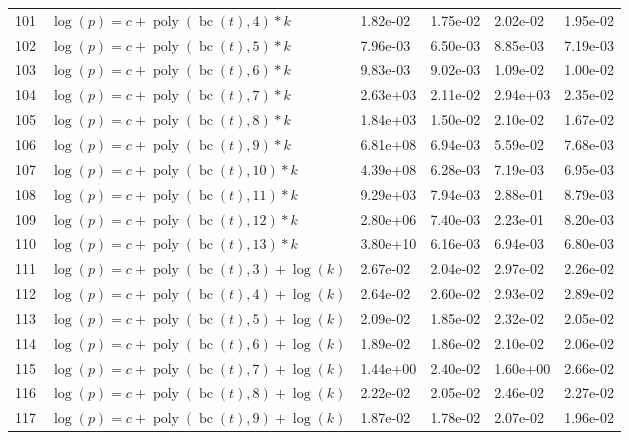 \documentclass[12pt,a4paper]{article}
\DeclareMathOperator{\bc}{bc}
\DeclareMathOperator{\poly}{poly}
\begin{document}
\begin{longtable}[t]{ll>{\raggedleft\arraybackslash}p{2cm}>{\raggedleft\arraybackslash}p{2cm}>{\raggedleft\arraybackslash}p{2cm}>{\raggedleft\arraybackslash}p{2cm}}
\rowcolor{gray!6}  101 & $\log(p) = c + \poly\left( \bc(t), 4 \right) * k$ & 1.82e-02 & 1.75e-02 & 2.02e-02 & 1.95e-02\\
102 & $\log(p) = c + \poly\left( \bc(t), 5 \right) * k$ & 7.96e-03 & 6.50e-03 & 8.85e-03 & 7.19e-03\\
\rowcolor{gray!6}  103 & $\log(p) = c + \poly\left( \bc(t), 6 \right) * k$ & 9.83e-03 & 9.02e-03 & 1.09e-02 & 1.00e-02\\
104 & $\log(p) = c + \poly\left( \bc(t), 7 \right) * k$ & 2.63e+03 & 2.11e-02 & 2.94e+03 & 2.35e-02\\
\rowcolor{gray!6}  105 & $\log(p) = c + \poly\left( \bc(t), 8 \right) * k$ & 1.84e+03 & 1.50e-02 & 2.10e-02 & 1.67e-02\\
106 & $\log(p) = c + \poly\left( \bc(t), 9 \right) * k$ & 6.81e+08 & 6.94e-03 & 5.59e-02 & 7.68e-03\\
\rowcolor{gray!6}  107 & $\log(p) = c + \poly\left( \bc(t), 10 \right) * k$ & 4.39e+08 & 6.28e-03 & 7.19e-03 & 6.95e-03\\
108 & $\log(p) = c + \poly\left( \bc(t), 11 \right) * k$ & 9.29e+03 & 7.94e-03 & 2.88e-01 & 8.79e-03\\
\rowcolor{gray!6}  109 & $\log(p) = c + \poly\left( \bc(t), 12 \right) * k$ & 2.80e+06 & 7.40e-03 & 2.23e-01 & 8.20e-03\\
110 & $\log(p) = c + \poly\left( \bc(t), 13 \right) * k$ & 3.80e+10 & 6.16e-03 & 6.94e-03 & 6.80e-03\\
\rowcolor{gray!6}  111 & $\log(p) = c + \poly\left( \bc(t), 3 \right) + \log(k)$ & 2.67e-02 & 2.04e-02 & 2.97e-02 & 2.26e-02\\
112 & $\log(p) = c + \poly\left( \bc(t), 4 \right) + \log(k)$ & 2.64e-02 & 2.60e-02 & 2.93e-02 & 2.89e-02\\
\rowcolor{gray!6}  113 & $\log(p) = c + \poly\left( \bc(t), 5 \right) + \log(k)$ & 2.09e-02 & 1.85e-02 & 2.32e-02 & 2.05e-02\\
114 & $\log(p) = c + \poly\left( \bc(t), 6 \right) + \log(k)$ & 1.89e-02 & 1.86e-02 & 2.10e-02 & 2.06e-02\\
\rowcolor{gray!6}  115 & $\log(p) = c + \poly\left( \bc(t), 7 \right) + \log(k)$ & 1.44e+00 & 2.40e-02 & 1.60e+00 & 2.66e-02\\
116 & $\log(p) = c + \poly\left( \bc(t), 8 \right) + \log(k)$ & 2.22e-02 & 2.05e-02 & 2.46e-02 & 2.27e-02\\
\rowcolor{gray!6}  117 & $\log(p) = c + \poly\left( \bc(t), 9 \right) + \log(k)$ & 1.87e-02 & 1.78e-02 & 2.07e-02 & 1.96e-02\\

\end{longtable}
\end{document}
